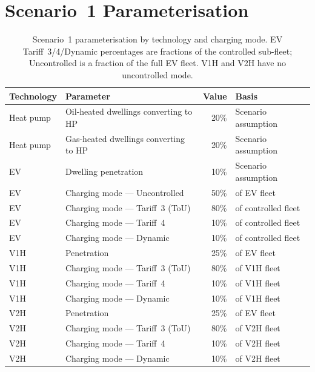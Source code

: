 \documentclass[preprint,12pt]{elsarticle}
\begin{document}
\section{Scenario~1 Parameterisation}
\label{app:scenario-parameters}

\begin{table}[H]
\centering
\caption{Scenario~1 parameterisation by technology and charging mode.
  EV Tariff~3/4/Dynamic percentages are fractions of the controlled
  sub-fleet; Uncontrolled is a fraction of the full EV fleet.
  V1H and V2H have no uncontrolled mode.}
\label{tab:scenario1_params}
\small
\begin{tabular}{llrl}
\toprule
\textbf{Technology} & \textbf{Parameter} & \textbf{Value} & \textbf{Basis} \\
\midrule
Heat pump & Oil-heated dwellings converting to HP  & 20\% & Scenario assumption \\
Heat pump & Gas-heated dwellings converting to HP  & 20\% & Scenario assumption \\
\midrule
EV        & Dwelling penetration                    & 10\% & Scenario assumption \\
EV        & Charging mode --- Uncontrolled          & 50\% & of EV fleet \\
EV        & Charging mode --- Tariff~3 (ToU)        & 80\% & of controlled fleet \\
EV        & Charging mode --- Tariff~4              & 10\% & of controlled fleet \\
EV        & Charging mode --- Dynamic               & 10\% & of controlled fleet \\
\midrule
V1H       & Penetration                             & 25\% & of EV fleet \\
V1H       & Charging mode --- Tariff~3 (ToU)        & 80\% & of V1H fleet \\
V1H       & Charging mode --- Tariff~4              & 10\% & of V1H fleet \\
V1H       & Charging mode --- Dynamic               & 10\% & of V1H fleet \\
\midrule
V2H       & Penetration                             & 25\% & of EV fleet \\
V2H       & Charging mode --- Tariff~3 (ToU)        & 80\% & of V2H fleet \\
V2H       & Charging mode --- Tariff~4              & 10\% & of V2H fleet \\
V2H       & Charging mode --- Dynamic               & 10\% & of V2H fleet \\

\end{tabular}
\end{table}
\end{document}
